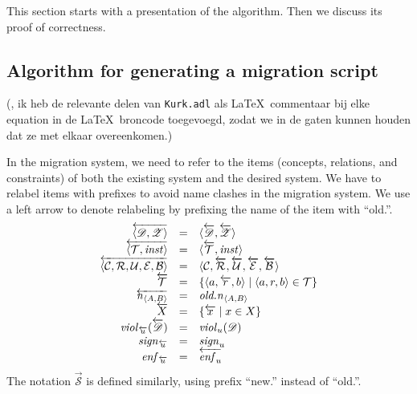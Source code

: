 \documentclass[runningheads]{llncs}
\newcommand{\id}[1]{\text{\it #1\/}}
\newcommand{\instance}{\mathbin{\id{inst}}}
\newcommand{\viol}[2]{\violC{#1}(#2)}
\newcommand{\violC}[1]{\id{viol}_{#1}}
\newcommand{\sign}[1]{\id{sign}_{#1}}
\newcommand{\enfRel}[1]{\id{enf}_{#1}}
\newcommand{\declare}[3]{\id{#1}_{\pair{#2}{#3}}}
\newcommand{\pair}[2]{\langle{#1},{#2}\rangle}
\newcommand{\triple}[3]{\langle{#1},{#2},{#3}\rangle}
\newcommand{\quintuple}[5]{\langle{#1},{#2},{#3},{#4},{#5}\rangle}
\newcommand{\concepts}{\mathcal{C}}
\newcommand{\rels}{\mathcal{R}}   %
\newcommand{\triples}{\mathcal{T}}
\newcommand{\rules}{\mathcal{U}}
\newcommand{\transactions}{\mathcal{E}}
\newcommand{\busConstraints}{\mathcal{B}}
\newcommand{\dataset}{\mathscr{D}}
\newcommand{\schema}{\mathscr{Z}}
\newcommand{\infsys}{\mathscr{S}}
\begin{document}
   This section starts with a presentation of the algorithm.
   Then we discuss its proof of correctness.

\subsection{Algorithm for generating a migration script}
   (\@Bas, ik heb de relevante delen van {\tt Kurk.adl} als \LaTeX\ commentaar bij elke equation in de \LaTeX\ broncode toegevoegd,
   zodat we in de gaten kunnen houden dat ze met elkaar overeenkomen.)

   In the migration system, we need to refer to the items (concepts, relations, and constraints) of both the existing system and the desired system.
   We have to relabel items with prefixes to avoid name clashes in the migration system.
   We use a left arrow to denote relabeling by prefixing the name of the item with ``old.''.
\begin{equation}
   \begin{array}[m]{rcl}
      \overleftarrow{\pair{\dataset}{\schema}}&=&\pair{\overleftarrow{\dataset}}{\overleftarrow{\schema}}\\
      \overleftarrow{\pair{\triples}{\instance}}&=&\pair{\overleftarrow{\triples}}{\instance}\\
      \overleftarrow{\quintuple{\concepts}{\rels}{\rules}{\transactions}{\busConstraints}}&=&\quintuple{\concepts}{\overleftarrow{\rels}}{\overleftarrow{\rules}}{\overleftarrow{\transactions}}{\overleftarrow{\busConstraints}}\\
      \overleftarrow{\triples}&=&\{\triple{a}{\overleftarrow{r}}{b}\mid\triple{a}{r}{b}\in\triples\}\\
      \overleftarrow{\declare{n}{A}{B}}&=&\declare{old.n}{A}{B}\\
      \overleftarrow{X}&=&\{\overleftarrow{x}\mid x\in X\}\\
      \viol{\overleftarrow{u}}{\overleftarrow{\dataset}}&=&\viol{u}{\dataset}\\
      \sign{\overleftarrow{u}}&=&\sign{u}\\
      \enfRel{\overleftarrow{u}}&=&\overleftarrow{\enfRel{u}}
   \end{array}
\end{equation}
   The notation $\overrightarrow{\infsys}$ is defined similarly, using prefix ``new.'' instead of ``old.''.
\end{document}
